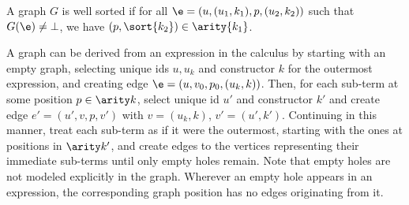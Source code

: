 % 


A graph $G$ is well sorted if
for all $\e = (u, (u_1, k_1), p, (u_2, k_2))$
such that $G(\e) \neq \bot$,
we have $(p, \sort{k_2}) \in \arity{k_1}$.








\vspace*{\baselineskip}

A graph can be derived from an expression in the calculus by starting with an
empty graph, selecting unique ids $u, u_k$ and constructor $k$ for the outermost
expression, and creating edge $\e = (u, v_0, p_0, (u_k, k))$. Then, for each
sub-term at some position $p \in \arity k$, select unique id $u'$ and
constructor $k'$ and create edge $e' = (u', v, p, v')$ with $v = (u_k, k)$, $v'
= (u', k')$. Continuing in this manner, treat each sub-term as if it were the
outermost, starting with the ones at positions in $\arity k'$, and create edges
to the vertices representing their immediate sub-terms until only empty holes
remain. Note that empty holes are not modeled explicitly in the graph. Wherever
an empty hole appears in an expression, the corresponding graph position has no
edges originating from it.

